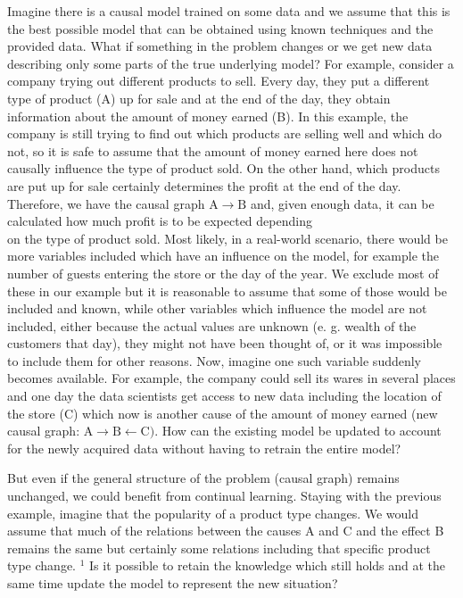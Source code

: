 \documentclass[10pt]{article}
\begin{document}
Imagine there is a causal model trained on some data and we assume that this is the best possible model that can be obtained using known techniques and the provided data. What if something in the problem changes or we get new data describing only some parts of the true underlying model? For example, consider a company trying out different products to sell. Every day, they put a different type of product (A) up for sale and at the end of the day, they obtain information about the amount of money earned (B). In this example, the company is still trying to find out which products are selling well and which do not, so it is safe to assume that the amount of money earned here does not causally influence the type of product sold. On the other hand, which products are put up for sale certainly determines the profit at the end of the day. Therefore, we have the causal graph $\mathrm{A} \rightarrow \mathrm{B}$ and, given enough data, it can be calculated how much profit is to be expected depending\\
on the type of product sold. Most likely, in a real-world scenario, there would be more variables included which have an influence on the model, for example the number of guests entering the store or the day of the year. We exclude most of these in our example but it is reasonable to assume that some of those would be included and known, while other variables which influence the model are not included, either because the actual values are unknown (e. g. wealth of the customers that day), they might not have been thought of, or it was impossible to include them for other reasons. Now, imagine one such variable suddenly becomes available. For example, the company could sell its wares in several places and one day the data scientists get access to new data including the location of the store (C) which now is another cause of the amount of money earned (new causal graph: $\mathrm{A} \rightarrow \mathrm{B} \leftarrow \mathrm{C})$. How can the existing model be updated to account for the newly acquired data without having to retrain the entire model?

But even if the general structure of the problem (causal graph) remains unchanged, we could benefit from continual learning. Staying with the previous example, imagine that the popularity of a product type changes. We would assume that much of the relations between the causes A and C and the effect B remains the same but certainly some relations including that specific product type change. ${ }^{1}$ Is it possible to retain the knowledge which still holds and at the same time update the model to represent the new situation?
\end{document}
